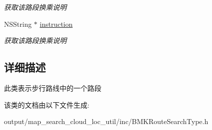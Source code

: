 \begin{DoxyCompactItemize}
\begin{DoxyCompactList}\small\item\em 获取该路段换乘说明 \end{DoxyCompactList}\item 
\hypertarget{interface_b_m_k_walking_step_ac55da8a1ca91a2b9d3bce4ddb711cf8e}{N\+S\+String $\ast$ \hyperlink{interface_b_m_k_walking_step_ac55da8a1ca91a2b9d3bce4ddb711cf8e}{instruction}}\label{interface_b_m_k_walking_step_ac55da8a1ca91a2b9d3bce4ddb711cf8e}

\begin{DoxyCompactList}\small\item\em 获取该路段换乘说明 \end{DoxyCompactList}\end{DoxyCompactItemize}


\subsection{详细描述}
此类表示步行路线中的一个路段 

该类的文档由以下文件生成\+:\begin{DoxyCompactItemize}
\item 
output/map\+\_\+search\+\_\+cloud\+\_\+loc\+\_\+util/inc/B\+M\+K\+Route\+Search\+Type.\+h\end{DoxyCompactItemize}
